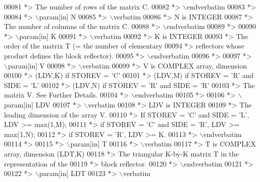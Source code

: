 \begin{DoxyCode}
00081 \textcolor{comment}{*>          The number of rows of the matrix C.}
00082 \textcolor{comment}{*> \(\backslash\)endverbatim}
00083 \textcolor{comment}{*>}
00084 \textcolor{comment}{*> \(\backslash\)param[in] N}
00085 \textcolor{comment}{*> \(\backslash\)verbatim}
00086 \textcolor{comment}{*>          N is INTEGER}
00087 \textcolor{comment}{*>          The number of columns of the matrix C.}
00088 \textcolor{comment}{*> \(\backslash\)endverbatim}
00089 \textcolor{comment}{*>}
00090 \textcolor{comment}{*> \(\backslash\)param[in] K}
00091 \textcolor{comment}{*> \(\backslash\)verbatim}
00092 \textcolor{comment}{*>          K is INTEGER}
00093 \textcolor{comment}{*>          The order of the matrix T (= the number of elementary}
00094 \textcolor{comment}{*>          reflectors whose product defines the block reflector).}
00095 \textcolor{comment}{*> \(\backslash\)endverbatim}
00096 \textcolor{comment}{*>}
00097 \textcolor{comment}{*> \(\backslash\)param[in] V}
00098 \textcolor{comment}{*> \(\backslash\)verbatim}
00099 \textcolor{comment}{*>          V is COMPLEX array, dimension}
00100 \textcolor{comment}{*>                                (LDV,K) if STOREV = 'C'}
00101 \textcolor{comment}{*>                                (LDV,M) if STOREV = 'R' and SIDE = 'L'}
00102 \textcolor{comment}{*>                                (LDV,N) if STOREV = 'R' and SIDE = 'R'}
00103 \textcolor{comment}{*>          The matrix V. See Further Details.}
00104 \textcolor{comment}{*> \(\backslash\)endverbatim}
00105 \textcolor{comment}{*>}
00106 \textcolor{comment}{*> \(\backslash\)param[in] LDV}
00107 \textcolor{comment}{*> \(\backslash\)verbatim}
00108 \textcolor{comment}{*>          LDV is INTEGER}
00109 \textcolor{comment}{*>          The leading dimension of the array V.}
00110 \textcolor{comment}{*>          If STOREV = 'C' and SIDE = 'L', LDV >= max(1,M);}
00111 \textcolor{comment}{*>          if STOREV = 'C' and SIDE = 'R', LDV >= max(1,N);}
00112 \textcolor{comment}{*>          if STOREV = 'R', LDV >= K.}
00113 \textcolor{comment}{*> \(\backslash\)endverbatim}
00114 \textcolor{comment}{*>}
00115 \textcolor{comment}{*> \(\backslash\)param[in] T}
00116 \textcolor{comment}{*> \(\backslash\)verbatim}
00117 \textcolor{comment}{*>          T is COMPLEX array, dimension (LDT,K)}
00118 \textcolor{comment}{*>          The triangular K-by-K matrix T in the representation of the}
00119 \textcolor{comment}{*>          block reflector.}
00120 \textcolor{comment}{*> \(\backslash\)endverbatim}
00121 \textcolor{comment}{*>}
00122 \textcolor{comment}{*> \(\backslash\)param[in] LDT}
00123 \textcolor{comment}{*> \(\backslash\)verbatim}

\end{DoxyCode}
